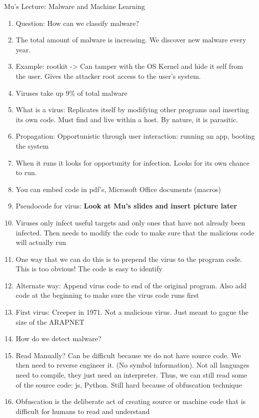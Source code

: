 \documentclass[a4paper, 11pt, oneside]{researchjournal} %
\begin{document}
 Mu's Lecture: Malware and Machine Learning
 \begin{enumerate}
     \item Question: How can we classify malware? 
     \item The total amount of malware is increasing. We discover new malware every year.
     \item Example: rootkit -> Can tamper with the OS Kernel and hide it self from the user. Gives the attacker root access to the user's system. 
     \item Viruses take up 9\% of total malware
     \item What is a virus: Replicates itself by modifying other programs and inserting its own code. Must find and live within a host. By nature, it is parasitic. 
     \item Propagation: Opportunistic through user interaction: running an app, booting the system
     \item When it runs it looks for opportunity for infection. Looks for its own chance to run.
     \item You can embed code in pdf's, Microsoft Office documents (macros)
     \item Pseudocode for virus: \textbf{Look at Mu's slides and insert picture later}
     \item Viruses only infect useful targets and only ones that have not already been infected. Then needs to modify the code to make sure that the malicious code will actually run
     \item One way that we can do this is to prepend the virus to the program code. This is too obvious! The code is easy to identify 
     \item Alternate way: Append virus code to end of the original program. Also add code at the beginning to make sure the virus code runs first
     \item First virus: Creeper in 1971. Not a malicious virus. Just meant to gague the size of the ARAPNET
     \item How do we detect malware?
     \item Read Manually? Can be difficult because we do not have source code. We then need to reverse engineer it. (No symbol information). Not all languages need to compile, they just need an interpreter. Thus, we can still read some of the source code: js, Python. Still hard because of obfuscation technique
     \item Obfuscation is the deliberate act of creating source or machine code that is difficult for humans to read and understand

\end{enumerate}
\end{document}
